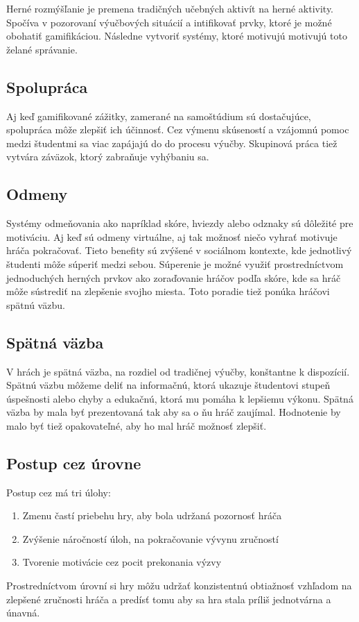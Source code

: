 \documentclass[10pt,twoside,slovak,a4paper]{article}
\begin{document}
Herné rozmýšľanie je premena tradičných učebných aktivít na herné aktivity. Spočíva v pozorovaní výučbových situácií a intifikovať prvky, ktoré je možné obohatiť gamifikáciou. Následne vytvoriť systémy, ktoré motivujú motivujú toto želané správanie. \cite{Werbach+Hunter}

\subsection{Spolupráca}

Aj keď gamifikované zážitky, zamerané na samoštúdium sú dostačujúce, spolupráca môže zlepšiť ich účinnosť. Cez výmenu skúseností a vzájomnú pomoc medzi študentmi sa viac zapájajú do do procesu výučby. Skupinová práca tiež vytvára záväzok, ktorý zabraňuje vyhýbaniu sa. \cite{Rego}

\subsection{Odmeny}

Systémy odmeňovania ako napríklad skóre, hviezdy alebo odznaky sú dôležité pre motiváciu. Aj keď sú odmeny virtuálne, aj tak možnosť niečo vyhrať motivuje hráča pokračovať. Tieto benefity sú zvýšené v sociálnom kontexte, kde jednotlivý študenti môže súperiť medzi sebou. Súperenie je možné využiť prostredníctvom jednoduchých herných prvkov ako zoraďovanie hráčov podľa skóre, kde sa hráč môže sústrediť na zlepšenie svojho miesta. Toto poradie tiež ponúka hráčovi spätnú väzbu. \cite{Kapp}

\subsection{Spätná väzba}

V hrách je spätná väzba, na rozdiel od tradičnej výučby, konštantne k dispozícií. Spätnú väzbu môžeme deliť na informačnú, ktorá ukazuje študentovi stupeň úspešnosti alebo chyby a edukačnú, ktorá mu pomáha k lepšiemu výkonu. Spätná väzba by mala byť prezentovaná tak aby sa o ňu hráč zaujímal. Hodnotenie by malo byť tiež opakovateľné, aby ho mal hráč možnosť zlepšiť.  \cite{Kapp}

\subsection{Postup cez úrovne}

Postup cez má tri úlohy:
\begin{enumerate}
	\item Zmenu častí priebehu hry, aby bola udržaná pozornosť hráča
	\item Zvýšenie náročností úloh, na pokračovanie vývynu zručností
	\item Tvorenie motivácie cez pocit prekonania výzvy
\end{enumerate}
Prostredníctvom úrovní si hry môžu udržať konzistentnú obtiažnosť vzhľadom na zlepšené zručnosti hráča a predísť tomu aby sa hra stala príliš jednotvárna a únavná. \cite{Kapp}
\end{document}
